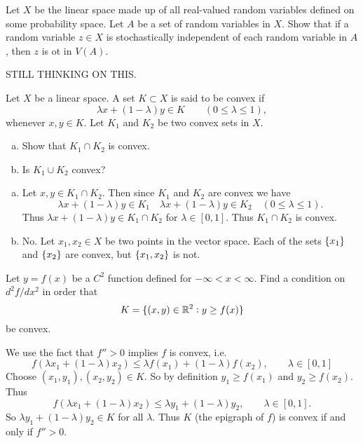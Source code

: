 \begin{problem}
	Let $ X $ be the linear space made up of all real-valued random variables defined on some probability space. Let $ A $ be a set of random variables in $ X $. Show that if a random variable $ z\in X $ is stochastically independent of each random variable in $ A $, then $ z $ is ot in $ V(A) $.
\end{problem}
\begin{solution}
	STILL THINKING ON THIS.
\end{solution}

\begin{problem}
	Let $ X $ be a linear space. A set $ K\subset X $ is said to be convex if
	\[ \lambda x + (1-\lambda)y \in K \qquad (0\leq \lambda \leq 1), \]
	whenever $ x,y\in K $. Let $ K_1 $ and $ K_2 $ be two convex sets in $ X $. 
	\begin{enumerate}[(a)]
		\item Show that $ K_1\cap K_2 $ is convex.
		\item Is $ K_1\cup K_2 $ convex?
	\end{enumerate}
\end{problem}
\begin{solution}
	\begin{enumerate}[(a)]
		\item Let $ x,y\in K_1\cap K_2 $. Then since $ K_1 $  and $ K_2 $ are convex we have
		\[ \lambda x + (1-\lambda)y \in K_1 \quad \lambda x + (1-\lambda)y \in K_2 \quad (0\leq \lambda \leq 1). \]
		Thus $ \lambda x + (1-\lambda) y \in K_1\cap K_2 $ for $ \lambda \in [0,1] $. Thus $ K_1\cap K_2 $ is convex.
		
		\item No. Let $ x_1,x_2 \in X $ be two points in the vector space. Each of the sets $ \{x_1\} $ and $ \{x_2\} $ are convex, but $ \{x_1,x_2\}$ is not.
	\end{enumerate}
\end{solution}

\begin{problem}
	Let $ y = f(x) $ be a $ C^2 $ function defined for $ -\infty < x <\infty $. Find a condition on $ d^2f/dx^2 $ in order that
	\[ K = \{(x,y)\in \mathbb{R}^2: y\geq f(x)\} \]
	be convex.
\end{problem}
\begin{solution}
	We use the fact that $ f''>0 $ implies $ f $ is convex, i.e. 
	\[ f(\lambda x_1 + (1-\lambda)x_2) \leq \lambda f(x_1) + (1-\lambda) f(x_2), \qquad \lambda\in [0,1] \]
	Choose $ (x_1,y_1),(x_2,y_2) \in K $. So by definition $ y_1 \geq f(x_1) $ and $ y_2 \geq f(x_2) $. Thus
	\[ f(\lambda x_1 + (1-\lambda)x_2) \leq \lambda y_1 + (1-\lambda) y_2, \qquad \lambda\in [0,1].  \]
	So $ \lambda y_1 + (1-\lambda) y_2 \in K  $ for all $ \lambda $. Thus $ K $ (the epigraph of $ f $) is convex if and only if $ f'' >0 $.
\end{solution}


















